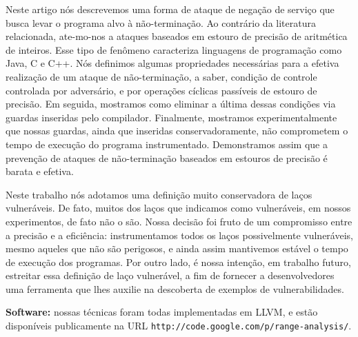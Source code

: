 \documentclass{llncs}
\begin{document}
Neste artigo nós descrevemos uma forma de ataque de negação de serviço que
busca levar o programa alvo à não-terminação.
Ao contrário da literatura relacionada, ate-mo-nos a ataques baseados em
estouro de precisão de aritmética de inteiros.
Esse tipo de fenômeno caracteriza linguagens de programação como Java, C e
C++.
Nós definimos algumas propriedades necessárias para a efetiva realização de
um ataque de não-terminação, a saber, condição de controle controlada por
adversário, e por operações cíclicas passíveis de estouro de precisão.
Em seguida, mostramos como eliminar a última dessas condições via guardas
inseridas pelo compilador.
Finalmente, mostramos experimentalmente que nossas guardas, ainda que inseridas
conservadoramente, não comprometem o tempo de execução do programa
instrumentado.
Demonstramos assim que a prevenção de ataques de não-terminação baseados em
estouros de precisão é barata e efetiva.

Neste trabalho nós adotamos uma definição muito conservadora de laços
vulneráveis.
De fato, muitos dos laços que indicamos como vulneráveis, em nossos
experimentos, de fato não o são.
Nossa decisão foi fruto de um compromisso entre a precisão e a eficiência:
instrumentamos todos os laços possivelmente vulneráveis, mesmo aqueles que
não são perigosos, e ainda assim mantivemos estável o tempo de execução dos
programas.
Por outro lado, é nossa intenção, em trabalho futuro, estreitar essa definição
de laço vulnerável, a fim de fornecer a desenvolvedores uma ferramenta que lhes
auxilie na descoberta de exemplos de vulnerabilidades.

\noindent
\textbf{Software: } nossas técnicas foram todas implementadas em LLVM, e estão
disponíveis publicamente na URL \texttt{http://code.google.com/p/range-analysis/}.



\end{document}
